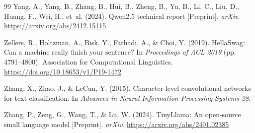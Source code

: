 \documentclass[preprint,12pt,authoryear]{elsarticle}
\begin{document}
\begin{thebibliography}{99}
Yang, A., Yang, B., Zhang, B., Hui, B., Zheng, B., Yu, B., Li, C., Liu, D., Huang, F., Wei, H., et~al. (2024). Qwen2.5 technical report [Preprint]. \emph{arXiv}. \url{https://arxiv.org/abs/2412.15115}

Zellers, R., Holtzman, A., Bisk, Y., Farhadi, A., \& Choi, Y. (2019). HellaSwag: Can a machine really finish your sentence? In \emph{Proceedings of ACL 2019} (pp. 4791--4800). Association for Computational Linguistics. \url{https://doi.org/10.18653/v1/P19-1472}

Zhang, X., Zhao, J., \& LeCun, Y. (2015). Character-level convolutional networks for text classification. In \emph{Advances in Neural Information Processing Systems 28}.

Zhang, P., Zeng, G., Wang, T., \& Lu, W. (2024). TinyLlama: An open-source small language model [Preprint]. \emph{arXiv}. \url{https://arxiv.org/abs/2401.02385}

\end{thebibliography}
\end{document}

